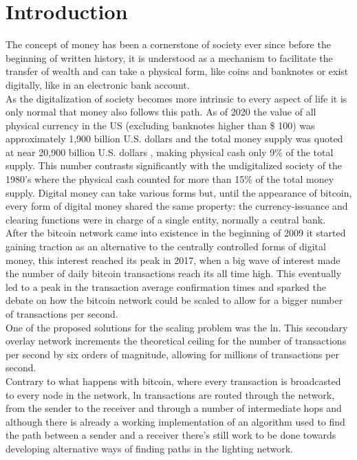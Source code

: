 \section{Introduction}

The concept of money has been a cornerstone of society ever since before the beginning of written history, it is understood as a mechanism to facilitate the transfer of wealth and can take a physical form, like coins and banknotes or exist digitally, like in an electronic bank account. \\
As the digitalization of society becomes more intrinsic to every aspect of life it is only normal that money also follows this path. As of 2020 the value of all physical currency in the US (excluding banknotes higher than \$ 100) was approximately 1,900 billion U.S. dollars \cite{currcir} and the total money supply was quoted at near 20,900 billion U.S. dollars \cite{mzm}, making physical cash only 9\% of the total supply. This number contrasts significantly with the undigitalized society of the 1980's where the physical cash counted for more than 15\% of the total money supply.
Digital money can take various forms but, until the appearance of bitcoin, every form of digital money shared the same property: the currency-issuance and clearing functions were in charge of a single entity, normally a central bank. \\
After the bitcoin network came into existence in the beginning of 2009 it started gaining traction as an alternative to the centrally controlled forms of digital money, this interest reached its peak in 2017, when a big wave of interest made the number of daily bitcoin transactions reach its all time high. This eventually led to a peak in the transaction average confirmation times and sparked the debate on how the bitcoin network could be scaled to allow for a bigger number of transactions per second. \\
One of the proposed solutions for the scaling problem was the \acrfull{ln}. This secondary overlay network increments the theoretical ceiling for the number of transactions per second by six orders of magnitude, allowing for millions of transactions per second.\\
Contrary to what happens with bitcoin, where every transaction is broadcasted to every node in the network, \acrshort{ln} transactions are routed through the network, from the sender to the receiver and through a number of intermediate hops and although there is already a working implementation of an algorithm used to find the path between a sender and a receiver there's still work to be done towards developing alternative ways of finding paths in the lighting network.
